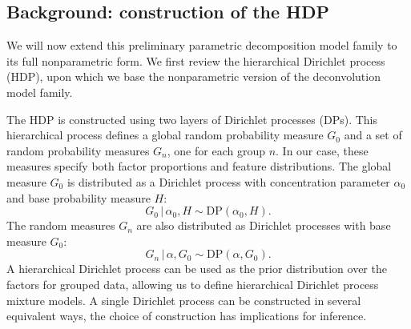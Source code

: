 \documentclass[twoside,11pt]{article}
\newcommand{\g}{\, | \,}
\begin{document}
\subsection{Background: construction of the HDP}
\label{sec:hdp}
We will now extend this preliminary parametric decomposition model family to its full nonparametric form.  We first review the hierarchical Dirichlet process (HDP), upon which we base the nonparametric version of the deconvolution model family.

The HDP \citep{Teh:2006} is constructed using two layers of Dirichlet processes (DPs).  This hierarchical process defines a global random probability measure $G_0$ and a set of random probability measures $G_n$, one for each group $n$. In our case, these measures specify both factor proportions and feature distributions.  The global measure $G_0$ is distributed as a Dirichlet process with concentration parameter $\alpha_0$ and base probability measure $H$: 
\begin{equation}
G_0 \g \alpha_0, H \sim \mbox{DP}(\alpha_0, H).
\end{equation}
The random measures $G_n$ are also distributed as Dirichlet processes with base measure $G_0$:
\begin{equation}
G_n \g \alpha, G_0 \sim \mbox{DP}(\alpha, G_0).
\end{equation}
A hierarchical Dirichlet process can be used as the prior distribution over the factors for grouped data, allowing us to define hierarchical Dirichlet process mixture models.  A single Dirichlet process can be constructed in several equivalent ways, the choice of construction has implications for inference.
\end{document}
